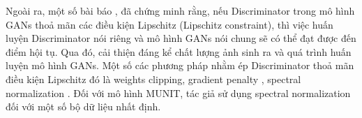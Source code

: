 {    Ngoài ra, một số bài báo \cite{lipschitz1}, \cite{lipschitz2} đã chứng minh rằng, nếu Discriminator trong mô hình GANs thoả mãn các điều kiện Lipschitz (Lipschitz constraint), thì việc huấn luyện Discriminator nói riêng và mô hình GANs nói chung sẽ có thể đạt được đến điểm hội tụ. Qua đó, cải thiện đáng kể chất lượng ảnh sinh ra và quá trình huấn luyện mô hình GANs. Một số các phương pháp nhằm ép Discriminator thoả mãn điều kiện Lipschitz đó là weights clipping, gradient penalty \cite{wgangp}, spectral normalization \cite{spectral}. Đối với mô hình MUNIT, tác giả sử dụng spectral normalization đối với một số bộ dữ liệu nhất định.
}